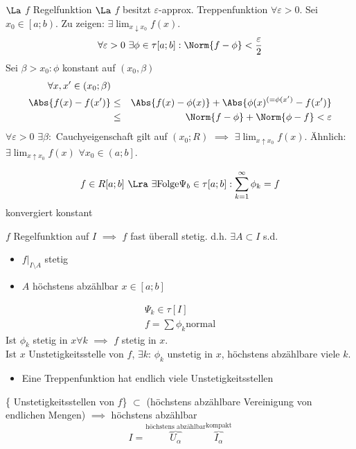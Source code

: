 \begin{Bew}{$\La$}
  $f$ Regelfunktion $\La$ $f$ besitzt $\varepsilon$-approx. Treppenfunktion $\forall \varepsilon>0$. Sei $x_0\in\left[a;b\right)$. Zu zeigen: $\exists \lim_{x\downarrow x_0} f(x)$.
  \begin{align*}
    \forall \varepsilon>0\ \exists\phi\in \tau[a;b]:\Norm{f-\phi}<\frac{\varepsilon}{2}\\
  \end{align*}
  Sei $\beta>x_0:\phi$ konstant auf $(x_0,\beta)$
  \begin{align*}
    \forall x,x'\in(x_0;\beta)\\
    \Abs{f(x)-f(x')}&\leq& \Abs{f(x)-\phi(x)}+\Abs{\phi(x)^{(=\phi(x')}-f(x')}\\
    &\leq&\Norm{f-\phi}+\Norm{\phi-f}<\varepsilon
  \end{align*}
  $\forall \varepsilon>0$ $\exists\beta:$ Cauchyeigenschaft gilt auf $(x_0;R)$ $\implies$ $\exists \lim_{x\uparrow x_0}f(x)$. Ähnlich: $\exists\lim_{x\uparrow x_0}f(x)$ $\forall x_0\in\left(a;b\right]$.
\end{Bew}
\begin{Kor}
  \[f\in R[a;b]\ \Lra\ \exists \text{Folge}\Psi_b\in\tau[a;b]:\sum^\infty_{k=1}\phi_k=f\]
  konvergiert konstant
\end{Kor}
\begin{Kor}
  $f$ Regelfunktion auf $I$ $\implies$ $f$ fast überall stetig. d.h. $\exists A\subset I$ s.d.
  \begin{itemize}
    \item $f|_{I\setminus A}$ stetig
    \item $A$ höchstens abzählbar $x\in[a;b]$
  \end{itemize}
\end{Kor}
\begin{Bew}
  \begin{align*}
    \Psi_k\in\tau [I]\\
    f=\sum\phi_k \text{normal}
  \end{align*}
  Ist $\phi_k$ stetig in $x\forall k$ $\implies$ $f$ stetig in $x$.\\
  Ist $x$ Unstetigkeitsstelle von $f$, $\exists k$: $\phi_k$ unstetig in $x$, höchstens abzählbare viele $k$.
  \begin{itemize}
    \item Eine Treppenfunktion hat endlich viele Unstetigkeitsstellen
  \end{itemize}  
  \{ Unstetigkeitsstellen von $f$\} $\subset$ (höchstens abzählbare Vereinigung von endlichen Mengen) $\implies$ höchstens abzählbar
  \[I=\overbrace{U_\alpha}^{\text{höchstens abzählbar}}\overbrace{I_\alpha}^{\text{kompakt}}\]
\end{Bew}
